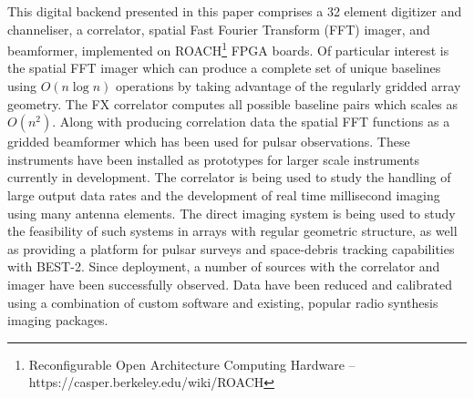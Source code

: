 \documentclass[useAMS,macros,usenatbib,onecolumn]{mn2e}
\begin{document}
This digital backend presented in this paper comprises a 32 element digitizer and channeliser, a correlator, spatial Fast Fourier Transform (FFT) imager, and beamformer, implemented on ROACH\footnote{Reconfigurable Open Architecture Computing Hardware -- https://casper.berkeley.edu/wiki/ROACH} FPGA boards.
Of particular interest is the spatial FFT imager which can produce a complete set of unique baselines using $O(n \log n)$ operations by taking advantage of the regularly gridded array geometry.
The FX correlator computes all possible baseline pairs which scales as $O(n^2)$.
Along with producing correlation data the spatial FFT functions as a gridded beamformer which has been used for pulsar observations.
These instruments have been installed as prototypes for larger scale instruments currently in development.
The correlator is being used to study the handling of large output data rates and the development of real time millisecond imaging using many antenna elements.
The direct imaging system is being used to study the feasibility of such systems in arrays with regular geometric structure, as well as providing a platform for pulsar surveys and space-debris tracking capabilities with BEST-2.
Since deployment, a number of sources with the correlator and imager have been successfully observed.
Data have been reduced and calibrated using a combination of custom software and existing, popular radio synthesis imaging packages.
\end{document}

